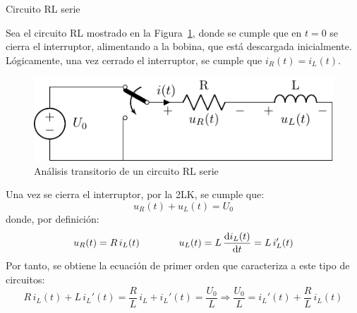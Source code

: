 \documentclass[11pt]{book} %
\makeatletter
\numberwithin{dummy}{section}
\theoremstyle{ocrenumbox}
\theoremstyle{blacknumex}
\theoremstyle{blacknumbox}
\theoremstyle{ocrenum}
\renewcommand{\subsection}{\@startsection {subsection}{2}{\z@}
{-3ex \@plus -0.1ex \@minus -.4ex}
{0.5ex \@plus.2ex }
{\normalfont\sffamily\bfseries}}
\makeatother
\begin{document}
	\subsection{Circuito RL serie}
	
	Sea el circuito RL mostrado en la Figura~\ref{fig.transitorio_RL}, donde se cumple que en $t = 0$ se cierra el interruptor, alimentando a la bobina, que está descargada inicialmente. Lógicamente, una vez cerrado el interruptor, se cumple que $i_R(t)=i_L(t)$.  
	\begin{figure}[htbp]
	    \centering
	    \includegraphics{../figs/transitorio_circuitoRL.pdf}
	    \caption{Análisis transitorio de un circuito RL serie}
	    \label{fig.transitorio_RL}
	\end{figure}
	
    Una vez se cierra el interruptor, por la 2LK, se cumple que:
	\begin{equation*}
	    u_R(t) + u_L(t) = U_0
	\end{equation*}
	donde, por definición: 
	\begin{equation*}
	    u_R(t)=R\,i_L(t)\qquad\qquad u_L(t)=L\,\diff{i_L(t)}{t}=L\,i_L'(t)
	\end{equation*}
	Por tanto, se obtiene la ecuación de primer orden que caracteriza a este tipo de circuitos:
	\begin{equation}\label{eq.1orden_L}
	    R\,i_L(t)+L\, i_L'(t)=\dfrac{R}{L}\,i_L+i_L'(t)=\dfrac{U_0}{L}\Rightarrow \boxed{\dfrac{U_0}{L}=i_L'(t)+\dfrac{R}{L}\,i_L(t)}
	\end{equation}
	
\end{document}
